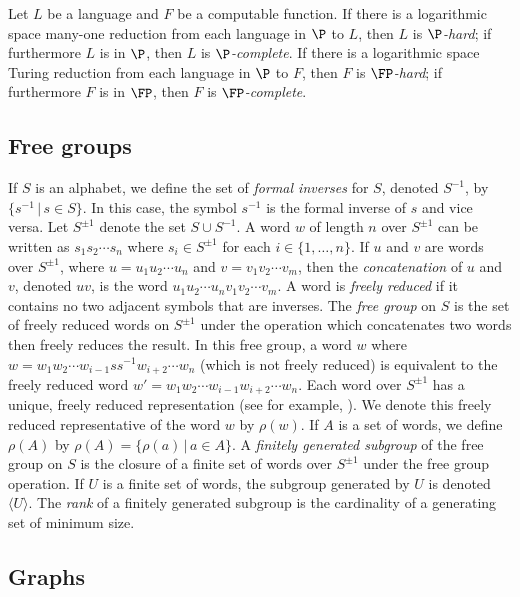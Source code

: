 \documentclass{article}
\newcommand{\gen}[1]{\langle #1 \rangle}
\newcommand{\Spm}{S^{\pm1}}
\begin{document}
Let $L$ be a language and $F$ be a computable function.
If there is a logarithmic space many-one reduction from each language in $\P$ to $L$, then $L$ is \emph{$\P$-hard}; if furthermore $L$ is in $\P$, then $L$ is \emph{$\P$-complete}.
If there is a logarithmic space Turing reduction from each language in $\P$ to $F$, then $F$ is \emph{$\FP$-hard}; if furthermore $F$ is in $\FP$, then $F$ is \emph{$\FP$-complete}.

\subsection{Free groups}

If $S$ is an alphabet, we define the set of \emph{formal inverses} for $S$, denoted $S^{-1}$, by $\{ s^{-1} \,|\, s \in S \}$.
In this case, the symbol $s^{-1}$ is the formal inverse of $s$ and vice versa.
Let $\Spm$ denote the set $S \cup S^{-1}$.
A word $w$ of length $n$ over $\Spm$ can be written as $s_1s_2\cdots s_n$ where $s_i \in \Spm$ for each $i \in \{1, \dotsc, n\}$.
If $u$ and $v$ are words over $\Spm$, where $u = u_1 u_2 \dotsb u_n$ and $v = v_1 v_2 \dotsb v_m$, then the \emph{concatenation} of $u$ and $v$, denoted $uv$, is the word $u_1 u_2 \cdots u_n v_1 v_2 \cdots v_m$.
A word is \emph{freely reduced} if it contains no two adjacent symbols that are inverses.
The \emph{free group} on $S$ is the set of freely reduced words on $\Spm$ under the operation which concatenates two words then freely reduces the result.
In this free group, a word $w$ where $w = w_1 w_2 \cdots w_{i - 1} s s^{-1} w_{i + 2} \cdots w_n$ (which is not freely reduced) is equivalent to the freely reduced word $w' = w_1 w_2 \cdots w_{i - 1} w_{i + 2} \cdots w_n$.
Each word over $\Spm$ has a unique, freely reduced representation (see for example, \cite[Section~I.1]{ls77}).
We denote this freely reduced representative of the word $w$ by $\rho(w)$.
If $A$ is a set of words, we define $\rho(A)$ by $\rho(A) = \{ \rho(a) \, | \, a \in A\}$.
A \emph{finitely generated subgroup} of the free group on $S$ is the closure of a finite set of words over $\Spm$ under the free group operation.
If $U$ is a finite set of words, the subgroup generated by $U$ is denoted $\gen{U}$.
The \emph{rank} of a finitely generated subgroup is the cardinality of a generating set of minimum size.

\subsection{Graphs}
\end{document}
